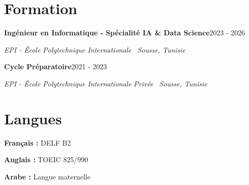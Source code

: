 \documentclass[11pt,a4paper]{article}
\newcommand{\entry}[2]{\textbf{#1}\hfill{\small\color{muted}#2}\par}
\newcommand{\org}[1]{{\itshape\color{muted}#1}\par}
\begin{document}
\noindent
\begin{minipage}[t]{0.72\textwidth}
  \section{Formation}
  \entry{Ingénieur en Informatique - Spécialité IA \& Data Science}{2023 - 2026}
  \org{EPI - École Polytechnique Internationale \textperiodcentered\ Sousse, Tunisie}
  \vspace{2pt}

  \entry{Cycle Préparatoire}{2021 - 2023}
  \org{EPI - École Polytechnique Internationale Privée \textperiodcentered\ Sousse, Tunisie}
\end{minipage}\hfill
\begin{minipage}[t]{0.25\textwidth}
  \section{Langues}
  \textbf{\color{accent}Français :} DELF B2\par\vspace{3.5pt}
  \textbf{\color{accent}Anglais :} TOEIC 825/990\par\vspace{3.5pt}
  \textbf{\color{accent}Arabe :} Langue maternelle\par
\end{minipage}
\end{document}

